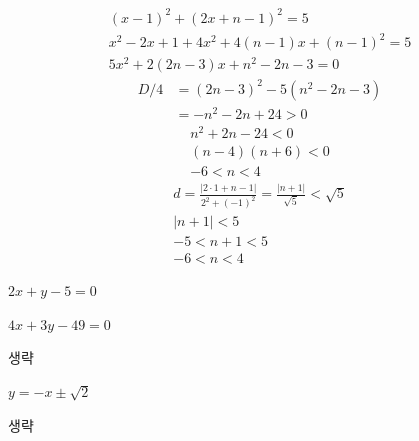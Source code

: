 \documentclass{oblivoir}
\begin{document}
%
\newpage
{}
\begin{gather*}
(x-1)^2+(2x+n-1)^2=5\\
x^2-2x+1+4x^2+4(n-1)x+(n-1)^2=5\\
5x^2+2(2n-3)x+n^2-2n-3=0
\end{gather*}
\begin{align*}
D/4
&=(2n-3)^2-5(n^2-2n-3)\\
&=-n^2-2n+24>0
\end{align*}
\begin{gather*}
n^2+2n-24<0\\
(n-4)(n+6)<0\\
-6<n<4
\end{gather*}
\begin{gather*}
d=\frac{|2\cdot1+n-1|}{2^2+(-1)^2}=\frac{|n+1|}{\sqrt5}<\sqrt5\\
|n+1|<5\\
-5<n+1<5\\
-6<n<4
\end{gather*}

\begin{minipage}[t]{.49\textwidth}
%
\(2x+y-5=0\)

%
\(4x+3y-49=0\)

%
생략

\end{minipage}
\begin{minipage}[t]{.49\textwidth}
%
\(y=-x\pm\sqrt2\)

%
생략
\end{minipage}


\end{document}
